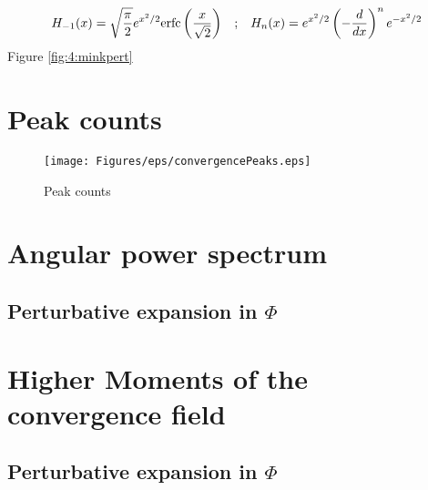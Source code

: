 \begin{equation}
\label{eq:4:hermite}
\begin{matrix}
\displaystyle H_{-1}(x) = \sqrt{\frac{\pi}{2}}e^{x^2/2}{\rm erfc}\left(\frac{x}{\sqrt{2}}\right) & ; & \displaystyle H_n(x) = e^{x^2/2}\left(-\frac{d}{dx}\right)^n e^{-x^2/2}
\end{matrix}
\end{equation}
%
Figure \ref{fig:4:minkpert}


\section{Peak counts}

%
\begin{figure}
\begin{center}
\texttt{[image: Figures/eps/convergencePeaks.eps]}
\end{center}
\caption{Peak counts}
\label{fig:4:peaks}
\end{figure}
%


\section{Angular power spectrum}

\subsection{Perturbative expansion in $\Phi$}


\section{Higher Moments of the convergence field}

\subsection{Perturbative expansion in $\Phi$}

